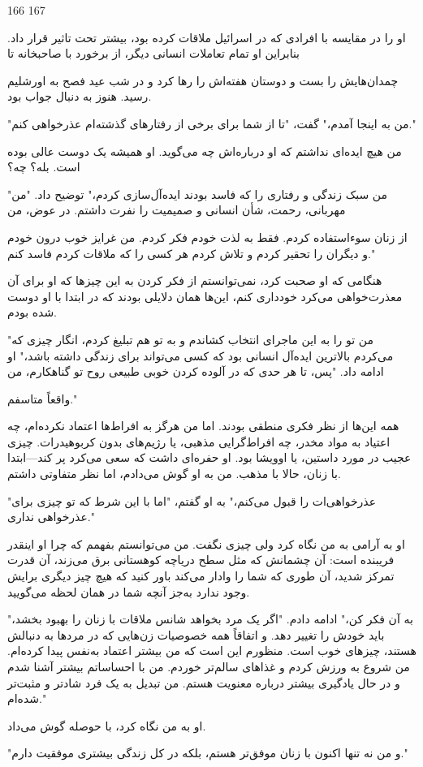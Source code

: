 166 167

او را در مقایسه با افرادی که در اسرائیل ملاقات کرده بود، بیشتر تحت تاثیر قرار داد. بنابراین او تمام تعاملات انسانی دیگر، از برخورد با صاحبخانه تا

چمدان‌هایش را بست و دوستان هفته‌اش را رها کرد و در شب عید فصح به اورشلیم رسید. هنوز به دنبال جواب بود.

"من به اینجا آمدم،" گفت، "تا از شما برای برخی از رفتارهای گذشته‌ام عذرخواهی کنم."

من هیچ ایده‌ای نداشتم که او درباره‌اش چه می‌گوید. او همیشه یک دوست عالی بوده است. بله؟ چه؟

"من سبک زندگی و رفتاری را که فاسد بودند ایده‌آل‌سازی کردم،" توضیح داد. "من مهربانی، رحمت، شأن انسانی و صمیمیت را نفرت داشتم. در عوض، من

از زنان سوءاستفاده کردم. فقط به لذت خودم فکر کردم. من غرایز خوب درون خودم و دیگران را تحقیر کردم و تلاش کردم هر کسی را که ملاقات کردم فاسد کنم."

هنگامی که او صحبت کرد، نمی‌توانستم از فکر کردن به این چیزها که او برای آن معذرت‌خواهی می‌کرد خودداری کنم، این‌ها همان دلایلی بودند که در ابتدا با او دوست شده بودم.

"من تو را به این ماجرای انتخاب کشاندم و به تو هم تبلیغ کردم، انگار چیزی که می‌کردم بالاترین ایده‌آل انسانی بود که کسی می‌تواند برای زندگی داشته باشد،" او ادامه داد. "پس، تا هر حدی که در آلوده کردن خوبی طبیعی روح تو گناهکارم، من

واقعاً متاسفم."

همه این‌ها از نظر فکری منطقی بودند. اما من هرگز به افراط‌ها اعتماد نکرده‌ام، چه اعتیاد به مواد مخدر، چه افراط‌گرایی مذهبی، یا رژیم‌های بدون کربوهیدرات. چیزی عجیب در مورد داستین، یا اوویشا بود. او حفره‌ای داشت که سعی می‌کرد پر کند—ابتدا با زنان، حالا با مذهب. من به او گوش می‌دادم، اما نظر متفاوتی داشتم.

"عذرخواهی‌ات را قبول می‌کنم،" به او گفتم، "اما با این شرط که تو چیزی برای عذرخواهی نداری."

او به آرامی به من نگاه کرد ولی چیزی نگفت. من می‌توانستم بفهمم که چرا او اینقدر فریبنده است: آن چشمانش که مثل سطح دریاچه کوهستانی برق می‌زند، آن قدرت تمرکز شدید، آن طوری که شما را وادار می‌کند باور کنید که هیچ چیز دیگری برایش وجود ندارد به‌جز آنچه شما در همان لحظه می‌گویید.

"به آن فکر کن،" ادامه دادم. "اگر یک مرد بخواهد شانس ملاقات با زنان را بهبود بخشد، باید خودش را تغییر دهد. و اتفاقاً همه خصوصیات زن‌هایی که در مردها به دنبالش هستند، چیزهای خوب است. منظورم این است که من بیشتر اعتماد به‌نفس پیدا کرده‌ام. من شروع به ورزش کردم و غذاهای سالم‌تر خوردم. من با احساساتم بیشتر آشنا شدم و در حال یادگیری بیشتر درباره معنویت هستم. من تبدیل به یک فرد شادتر و مثبت‌تر شده‌ام."

او به من نگاه کرد، با حوصله گوش می‌داد.

"و من نه تنها اکنون با زنان موفق‌تر هستم، بلکه در کل زندگی بیشتری موفقیت دارم."
